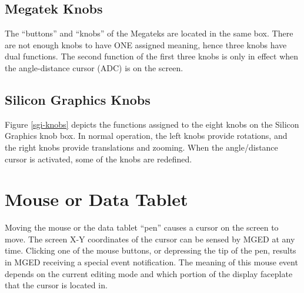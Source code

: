 \subsection{Megatek Knobs}

The ``buttons'' and ``knobs'' of the Megateks are located in the same box.
There are not enough knobs to have ONE assigned meaning, hence
three knobs have dual functions.
The second function of the first three knobs is only in effect when
the angle-distance cursor (ADC) is on the screen.

\subsection{Silicon Graphics Knobs}

Figure \ref{sgi-knobs} depicts the functions assigned to the
eight knobs on the Silicon Graphics knob box.
In normal operation, the left knobs provide rotations,
and the right knobs provide translations and zooming.
When the angle/distance cursor is activated, some of the
knobs are redefined.

\section{Mouse or Data Tablet}

Moving the mouse or the data tablet ``pen'' causes a cursor
on the screen to move.
The screen X-Y coordinates of the cursor can be sensed by MGED
at any time.
Clicking one of the mouse buttons,
or depressing the tip of the pen, results in MGED receiving
a special event notification.
The meaning of this mouse event depends on the current editing mode
and which portion of the display faceplate that the cursor is located
in.

